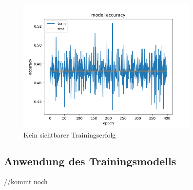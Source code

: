 \documentclass[conference]{IEEEtran}
\begin{document}
	\begin{figure}[!h]
		\centering
		\includegraphics[width=9cm]{img/480x360:400@32_accuracy.png}
		\caption{Kein sichtbarer Trainingserfolg}
		\label{erfolgloos }
	\end{figure}
	
	
	\subsection{Anwendung des Trainingsmodells} %
	//kommt noch
\end{document}
